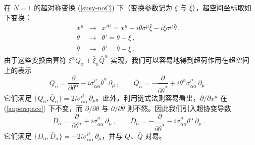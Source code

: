 
在 $N=1$ 的超对称变换 (\ref{susy-noC}) 下（变换参数记为 $\xi$ 与 $\bar\xi$），超空间坐标取如下变换：
\begin{eqnarray}
x^\mu &\rightarrow& x'^\mu=x^\mu + i\theta\sigma^\mu\bar\xi
- i\xi\sigma^\mu\bar\theta \,,\nonumber\\
\theta &\rightarrow&\theta'=\theta + \xi\,, \nonumber\\
\bar\theta &\rightarrow& \bar\theta'=\bar\theta +\bar\xi\,.
\label{superspace}
\end{eqnarray}
由于这些变换由算符
$\xi^\alpha Q_\alpha + \bar{\xi}_{\dot\alpha}\bar{Q}^{\dot\alpha}$ 实现，我们可以容易地得到超荷作用在超空间上的表示
\begin{equation}
Q_\alpha=\frac{\partial}{\partial\theta^\alpha}- 
i\sigma^\mu_{\alpha\dot{\alpha}}\bar{\theta}^{\dot{\alpha}}\,
\partial_\mu\,,\qquad \bar{Q}_{\dot\alpha} = -\frac{\partial}{\partial
\bar{\theta}^{\dot\alpha}}+i\theta^\alpha 
\sigma^\mu_{\alpha\dot{\alpha}}\, \partial_\mu\,.
\label{superspace-Q}
\end{equation}
它们满足 $\{Q_\alpha ,\bar{Q}_{\dot\alpha}\}= 
2i\sigma^\mu_{\alpha\dot\alpha}\,\partial_\mu$。此外，利用链式法则容易看出，$\partial/\partial x^\mu$ 在 (\ref{superspace}) 下不变，而 $\partial/\partial\theta$ 与 $\partial/\partial\bar\theta$ 则不然。因此我们引入超协变导数
\begin{equation}
D_\alpha = \frac{\partial}{\partial \theta^\alpha} +
i\sigma^\mu_{\alpha\dot\alpha}\,\partial_\mu \,,\qquad
\bar{D}_{\dot{\alpha}} = -\frac{\partial}{\partial
\bar{\theta}^{\dot{\alpha}}}-i\sigma^\mu_{\alpha \dot{\alpha}}
\theta^{\alpha} \, \partial_\mu \,.
\label{superspaceD}
\end{equation}
它们满足 $\{ D_\alpha,\bar{D}_{\dot\alpha}\}=-2i\sigma^\mu_{\alpha
\dot{\alpha}}\,\partial_\mu$，并与 $Q$、$\bar Q$ 对易。


